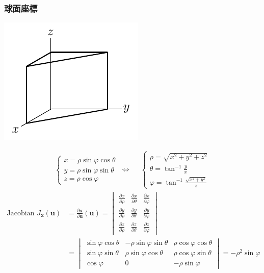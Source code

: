 \documentclass[12pt]{extarticle}
\newcommand{\ifff}{\;\Longleftrightarrow\;}
\theoremstyle{definition}
\newcommand{\vu}{\mathbf{u}}
\newcommand{\vx}{\mathbf{x}}
\begin{document}
\subsubsection*{球面座標}
\begin{minipage}{0.3\textwidth}
  \includegraphics[scale=0.9,page=14]{fig/text.pdf} \\
\end{minipage}
\begin{minipage}{0.7\textwidth}
  \begin{align*}
    \begin{cases}
      x = \rho\sin\varphi\cos\theta \\
      y = \rho\sin\varphi\sin\theta \\
      z = \rho\cos\varphi 
    \end{cases} \ifff \quad
    \begin{cases}
      \rho = \sqrt{x^2 + y^2 + z^2}\\
      \theta = \tan^{-1}\frac{y}{x} \\
      \varphi = \tan^{-1}\frac{\sqrt{x^2 + y^2}}{z} 
    \end{cases}
  \end{align*}
  \begin{align*}
    \text{Jacobian } J_{\vx}(\vu) &= \frac{\partial\vx}{\partial\vu}(\vu) = \begin{vmatrix}\frac{\partial x}{\partial\rho} & \frac{\partial x}{\partial\theta}  & \frac{\partial x}{\partial\varphi} \\ \frac{\partial y}{\partial\rho} & \frac{\partial y}{\partial\theta} & \frac{\partial y}{\partial\varphi}\\ \frac{\partial z}{\partial\rho} & \frac{\partial z}{\partial\theta} & \frac{\partial z}{\partial\varphi}\end{vmatrix} \\ &= \begin{vmatrix}\sin\varphi\cos\theta & -\rho\sin\varphi\sin\theta & \rho\cos\varphi\cos\theta \\ \sin\varphi\sin\theta & \rho\sin\varphi\cos\theta & \rho\cos\varphi\sin\theta\\ \cos\varphi & 0 & -\rho\sin\varphi\end{vmatrix} = -\rho^2\sin\varphi
  \end{align*}
\end{minipage}
\end{document}
